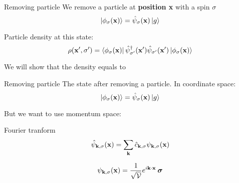 
\begin{frame}{Removing particle}
  We remove a particle at \textbf{position x} with a spin $\sigma$
  \begin{equation*}
    \ket{\phi_\sigma(\textbf{x})} = \hat{\psi}_\sigma(\textbf{x})\ket{g}
  \end{equation*}

  \vspace{0.5cm}
  Particle density at this state:
  \begin{equation*}
    \rho(\textbf{x}', \sigma') = \bra{\phi_\sigma(\textbf{x})}\hat{\psi}_{\sigma'}^\dagger(\textbf{x}')\hat{\psi}_{\sigma'}(\textbf{x}')\ket{\phi_\sigma(\textbf{x})}
  \end{equation*}

  \vspace{0.5cm}
  We will show that the density equals to

\end{frame}

\begin{frame}{Removing particle}
  The state after removing a particle. In coordinate space:
  \begin{equation*}
    \ket{\phi_\sigma(\textbf{x})} = \hat{\psi}_\sigma(\textbf{x})\ket{g}
  \end{equation*}

  But we want to use momentum space:

  \begin{block}{Fourier tranform}
    $$\hat{\psi}_{\textbf{k}, \sigma}(\textbf{x}) = \sum_{\textbf{k}} \hat{c}_{\textbf{k},\sigma} \psi_{\textbf{k},\sigma}(\textbf{x})$$
  \end{block}
  \begin{equation*}
    \begin{gathered}
      \psi_{\textbf{k}, \sigma}(\textbf{x}) = \frac{1}{\sqrt{\mathcal{V}}} e^{i\textbf{k} \cdot \textbf{x}} \: \boldsymbol{\sigma}
    \end{gathered}
  \end{equation*}

\end{frame}

